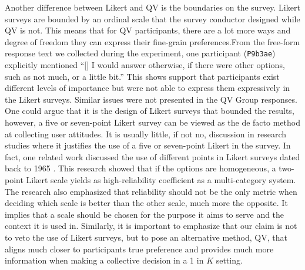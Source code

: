 Another difference between Likert and QV is the boundaries on the survey. Likert surveys are bounded by an ordinal scale that the survey conductor designed while QV is not. This means that for QV participants, there are a lot more ways and degree of freedom they can express their fine-grain preferences.From the free-form response text we collected during the experiment, one participant (\texttt{P9b3ae}) explicitly mentioned ``[\textellipsis] I would answer otherwise, if there were other options, such as not much, or a little bit.'' This shows support that participants exist different levels of importance but were not able to express them expressively in the Likert surveys. Similar issues were not presented in the QV Group responses. One could argue that it is the design of Likert surveys that bounded the results, however, a five or seven-point Likert survey can be viewed as the de facto method at collecting user attitudes. It is usually little, if not no, discussion in research studies where it justifies the use of a five or seven-point Likert in the survey. In fact, one related work discussed the use of different points in Likert surveys dated back to 1965 \cite{komorita1965number}. This research showed that if the options are homogeneous, a two-point Likert scale yields as high-reliability coefficient as a multi-category system. The research also emphasized that reliability should not be the only metric when deciding which scale is better than the other scale, much more the opposite. It implies that a scale should be chosen for the purpose it aims to serve and the context it is used in. Similarly, it is important to emphasize that our claim is not to veto the use of Likert surveys, but to pose an alternative method, QV, that aligns much closer to participants true preference and provides much more information when making a collective decision in a 1 in $K$ setting.




